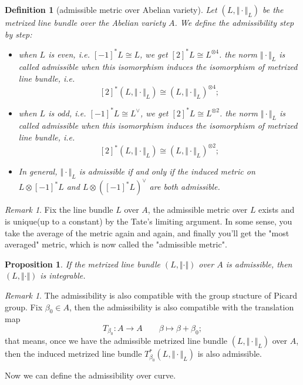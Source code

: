 \documentclass[reqno,11pt]{amsart}
\numberwithin{equation}{section}
\theoremstyle{plain}
\newtheorem{proposition}[theorem]{Proposition}
\newtheorem{defn}[theorem]{Definition}
\theoremstyle{plain}
\numberwithin{equation}{section}
\theoremstyle{remark}
\newtheorem{remark}[theorem]{Remark}
\newcommand{\norm}[1]{\Vert{#1}\Vert}
\begin{document}
\begin{defn}[admissible metric over Abelian variety]
Let $(L,\norm{\cdot}_L)$ be the metrized line bundle over the Abelian variety $A$. We define the admissibility step by step:
\begin{itemize}
\item  when $L$ is even, i.e. $[-1]^*L\cong L$, we get $[2]^*L\cong L^{\otimes 4}$. the norm $\norm{\cdot}_L$ is called admissible when this isomorphism induces the isomorphism of metrized line bundle, i.e.
$$[2]^*(L,\norm{\cdot}_L)\cong (L,\norm{\cdot}_L)^{\otimes 4};$$ 
\item  when $L$ is odd, i.e. $[-1]^*L\cong L^{\vee}$, we get $[2]^*L\cong L^{\otimes 2}$. the norm $\norm{\cdot}_L$ is called admissible when this isomorphism induces the isomorphism of metrized line bundle, i.e.
$$[2]^*(L,\norm{\cdot}_L)\cong (L,\norm{\cdot}_L)^{\otimes 2};$$ 
\item In general, $\norm{\cdot}_L$ is admissible if and only if the induced metric on $L \otimes [-1]^*L$ and $L \otimes ([-1]^*L)^{\vee}$ are both admissible.
\end{itemize}
\end{defn}
\begin{remark}
Fix the line bundle $L$ over $A$, the admissible metric over $L$ exists and is unique(up to a constant) by the Tate's limiting argument. In some sense, you take the average of the metric again and again, and finally you'll get the "most averaged" metric, which is now called the "admissible metric".
\end{remark}
\begin{proposition}
If the metrized line bundle $(L,\norm{\cdot})$ over $A$ is admissible, then $(L,\norm{\cdot})$ is integrable.
\end{proposition}
\begin{remark}
The admissibility is also compatible with the group stucture of Picard group. Fix $\beta_0 \in A$, then the admissibility is also compatible with the translation map
$$T_{\beta_0}: A\longrightarrow A \qquad \beta \longmapsto \beta+\beta_0;$$
that means, once we have the admissible metrized line bundle $(L,\norm{\cdot}_L)$ over $A$, then the induced metrized line bundle $T_{\beta_0}^{*}(L,\norm{\cdot}_L)$ is also admissible.
\end{remark}
Now we can define the admissibility over curve.
\end{document}
